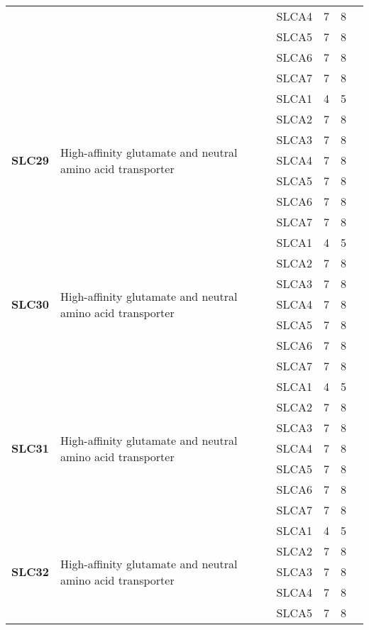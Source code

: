 \documentclass[12pt]{report}
\begin{document}
\begin{center}
\begin{longtable}{|p{1.5cm}|p{3.2cm}|p{1.9cm}|p{1.65cm}|p{3cm}|p{3cm}|}
\cline{3-6}
&&SLCA4&7 & 8&\\ 
\cline{3-6}
&&SLCA5&7 & 8&\\ 
\cline{3-6}
&&SLCA6&7 & 8&\\ 
\cline{3-6}
&&SLCA7&7 & 8&\\ 
\hline
\multirow{7}{1.5cm}{\textbf{SLC29}} & \multirow{7}{4cm}{High-affinity glutamate and neutral amino acid transporter} & SLCA1 & 4 & 5\\ 
\cline{3-6}
&&SLCA2&7 & 8&\\ 
\cline{3-6}
&&SLCA3&7 & 8&\\ 
\cline{3-6}
&&SLCA4&7 & 8&\\ 
\cline{3-6}
&&SLCA5&7 & 8&\\ 
\cline{3-6}
&&SLCA6&7 & 8&\\ 
\cline{3-6}
&&SLCA7&7 & 8&\\ 
\hline
\multirow{7}{1.5cm}{\textbf{SLC30}} & \multirow{7}{4cm}{High-affinity glutamate and neutral amino acid transporter} & SLCA1 & 4 & 5\\ 
\cline{3-6}
&&SLCA2&7 & 8&\\ 
\cline{3-6}
&&SLCA3&7 & 8&\\ 
\cline{3-6}
&&SLCA4&7 & 8&\\ 
\cline{3-6}
&&SLCA5&7 & 8&\\ 
\cline{3-6}
&&SLCA6&7 & 8&\\ 
\cline{3-6}
&&SLCA7&7 & 8&\\ 
\hline
\multirow{7}{1.5cm}{\textbf{SLC31}} & \multirow{7}{4cm}{High-affinity glutamate and neutral amino acid transporter} & SLCA1 & 4 & 5\\ 
\cline{3-6}
&&SLCA2&7 & 8&\\ 
\cline{3-6}
&&SLCA3&7 & 8&\\ 
\cline{3-6}
&&SLCA4&7 & 8&\\ 
\cline{3-6}
&&SLCA5&7 & 8&\\ 
\cline{3-6}
&&SLCA6&7 & 8&\\ 
\cline{3-6}
&&SLCA7&7 & 8&\\ 
\hline
\multirow{7}{1.5cm}{\textbf{SLC32}} & \multirow{7}{4cm}{High-affinity glutamate and neutral amino acid transporter} & SLCA1 & 4 & 5\\ 
\cline{3-6}
&&SLCA2&7 & 8&\\ 
\cline{3-6}
&&SLCA3&7 & 8&\\ 
\cline{3-6}
&&SLCA4&7 & 8&\\ 
\cline{3-6}
&&SLCA5&7 & 8&\\ 

\end{longtable}
\end{center}
\end{document}
